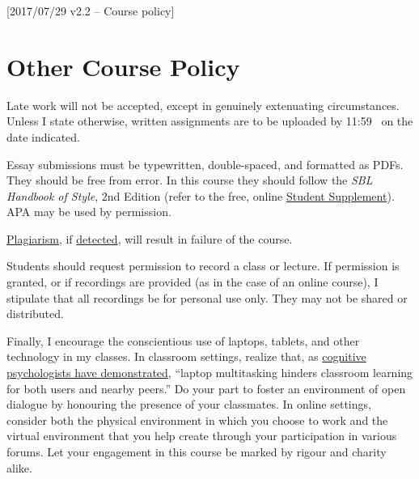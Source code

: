 [2017/07/29 v2.2 -- Course policy]

\section{Other Course Policy}
\label{policy}

Late work will not be accepted, except in genuinely extenuating
circumstances. Unless I state otherwise, written assignments are to be
uploaded by 11:59 \PM\ on the date indicated.

Essay submissions must be typewritten, double-spaced, and formatted as
PDFs. They should be free from error. In this course they should follow
the \emph{SBL Handbook of Style}, 2nd Edition (refer to the free, online
\href{https://www.sbl-site.org/assets/pdfs/pubs/SBLHSsupp2015-02.pdf}{
Student Supplement}). APA may be used by permission.

\href{http://www.eerdmans.com/Pages/Item/59043/Commentary-Statement.aspx}{Plagiarism},
if \href{https://www.theguardian.com/world/2013/feb/09/german-education-minister-quits-phd-plagiarism}{detected},
will result in failure of the course.

Students should request permission to record a class or lecture. If
permission is granted, or if recordings are provided (as in the case of
an online course), I stipulate that all recordings be for personal use
only. They may not be shared or distributed.

Finally, I encourage the conscientious use of laptops, tablets, and
other technology in my classes. In classroom settings, realize that, as
\href{http://dx.doi.org/10.1016/j.compedu.2012.10.003}{cognitive
psychologists have demonstrated}, ``laptop multitasking hinders
classroom learning for both users and nearby peers.'' Do your part to
foster an environment of open dialogue by honouring the presence of your
classmates. In online settings, consider both the physical environment
in which you choose to work and the virtual environment that you help
create through your participation in various forums. Let your engagement
in this course be marked by rigour and charity alike.